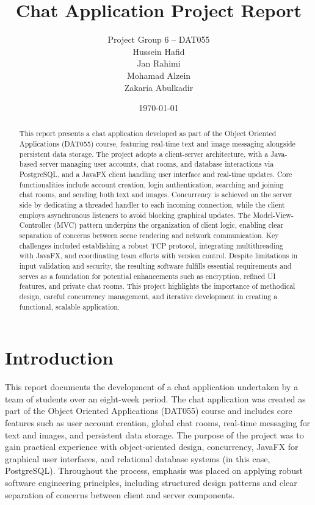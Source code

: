 \documentclass[12pt,a4paper]{report}
\title{Chat Application Project Report}
\author{
  Project Group 6 -- DAT055
  \\ Hussein Hafid \\ Jan Rahimi \\ Mohamad Alzein \\ Zakaria Abulkadir
}
\date{\today}
\begin{document}
\maketitle

\begin{abstract}
  This report presents a chat application developed as part of the Object
  Oriented Applications (DAT055) course, featuring real-time text and image
  messaging alongside persistent data storage. The project adopts a client-server
  architecture, with a Java-based server managing user accounts, chat rooms, and
  database interactions via PostgreSQL, and a JavaFX client handling user
  interface and real-time updates. Core functionalities include account creation,
  login authentication, searching and joining chat rooms, and sending both text
  and images. Concurrency is achieved on the server side by dedicating a threaded
  handler to each incoming connection, while the client employs asynchronous
  listeners to avoid blocking graphical updates. The Model-View-Controller (MVC)
  pattern underpins the organization of client logic, enabling clear separation
  of concerns between scene rendering and network communication. Key challenges
  included establishing a robust TCP protocol, integrating multithreading with
  JavaFX, and coordinating team efforts with version control. Despite limitations
  in input validation and security, the resulting software fulfills essential
  requirements and serves as a foundation for potential enhancements such as
  encryption, refined UI features, and private chat rooms. This project
  highlights the importance of methodical design, careful concurrency management,
  and iterative development in creating a functional, scalable application.
\end{abstract}

\tableofcontents
\newpage

\chapter{Introduction}
This report documents the development of a chat application undertaken by a
team of students over an eight-week period. The chat application was created as
part of the Object Oriented Applications (DAT055) course and includes core
features such as user account creation, global chat rooms, real-time messaging
for text and images, and persistent data storage. The purpose of the project
was to gain practical experience with object-oriented design, concurrency,
JavaFX for graphical user interfaces, and relational database systems (in this
case, PostgreSQL). Throughout the process, emphasis was placed on applying
robust software engineering principles, including structured design patterns
and clear separation of concerns between client and server components.
\end{document}
